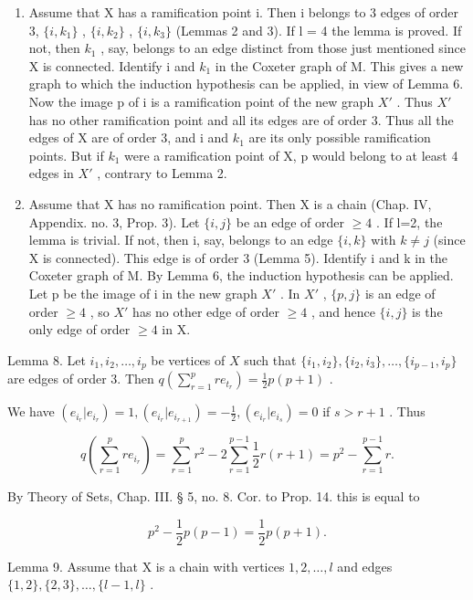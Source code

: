 \begin{enumerate}
\def\labelenumi{\alph{enumi})}
\item
  Assume that X has a ramification point i. Then i belongs to 3 edges of order 3, \(\{i, k_{1}\}\) , \(\{i, k_{2}\}\) , \(\{i, k_{3}\}\) (Lemmas 2 and 3). If l = 4 the lemma is proved. If not, then \(k_{1}\) , say, belongs to an edge distinct from those just mentioned since X is connected. Identify i and \(k_{1}\) in the Coxeter graph of M. This gives a new graph to which the induction hypothesis can be applied, in view of Lemma 6. Now the image p of i is a ramification point of the new graph \(X'\) . Thus \(X'\) has no other ramification point and all its edges are of order 3. Thus all the edges of X are of order 3, and i and \(k_{1}\) are its only possible ramification points. But if \(k_{1}\) were a ramification point of X, p would belong to at least 4 edges in \(X'\) , contrary to Lemma 2.
\item
  Assume that X has no ramification point. Then X is a chain (Chap. IV, Appendix. no. 3, Prop. 3). Let \(\{i,j\}\) be an edge of order \(\geqslant4\) . If l=2, the lemma is trivial. If not, then i, say, belongs to an edge \(\{i,k\}\) with \(k\neq j\) (since X is connected). This edge is of order 3 (Lemma 5). Identify i and k in the Coxeter graph of M. By Lemma 6, the induction hypothesis can be applied. Let p be the image of i in the new graph \(X'\) . In \(X'\) , \(\{p,j\}\) is an edge of order \(\geqslant4\) , so \(X'\) has no other edge of order \(\geqslant4\) , and hence \(\{i,j\}\) is the only edge of order \(\geqslant4\) in X.
\end{enumerate}

Lemma 8. Let \(i_1, i_2, \ldots, i_p\) be vertices of \(X\) such that \(\{i_1, i_2\}, \{i_2, i_3\}, \ldots, \{i_{p-1}, i_p\}\) are edges of order 3. Then \(q(\sum_{r=1}^{p} re_{t_r}) = \frac{1}{2} p(p + 1)\) .

We have \((e_{i_r}|e_{i_r}) = 1, (e_{i_r}|e_{i_{r+1}}) = -\frac{1}{2}, (e_{i_r}|e_{i_s}) = 0\) if \(s > r + 1\) . Thus

\[
q \left(\sum_ {r = 1} ^ {p} r e _ {i _ {r}}\right) = \sum_ {r = 1} ^ {p} r ^ {2} - 2 \sum_ {r = 1} ^ {p - 1} \frac {1}{2} r (r + 1) = p ^ {2} - \sum_ {r = 1} ^ {p - 1} r.
\]

By Theory of Sets, Chap. III. § 5, no. 8. Cor. to Prop. 14. this is equal to

\[
p ^ {2} - \frac {1}{2} p (p - 1) = \frac {1}{2} p (p + 1).
\]

Lemma 9. Assume that X is a chain with vertices \(1,2,\ldots,l\) and edges \(\{1,2\},\{2,3\},\ldots,\{l-1,l\}\) .

